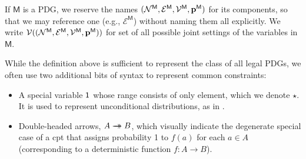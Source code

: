 \documentclass{article}
\newcommand{\commentout}[1]{\ignorespaces}
\newcommand{\doubleheadrightarrow}{%
	\rightarrow\mathrel{\mspace{-15mu}}\rightarrow}
\newcommand{\V}{\mathcal V}
\newcommand{\Ed}{\mathcal E}
\newcommand{\sfM}{\mathsf M}
\newcommand{\MN}{PDG}
\newcommand{\MNs}{\MN s}
\numberwithin{equation}{section}
\begin{document}
	If $\sfM$ is a \MN, we reserve the names $\mnvars[^\sfM]$ for its components, so that we may reference one (e.g., $\Ed^\sfM$) without naming them all explicitly.
	We write $\V(\mnvars[^\sfM])$ for set of all possible joint settings of
        the variables in $\sfM$.  
	

	While the definition above is sufficient to represent the class of all legal \MNs,
	we often use two additional bits of syntax to represent common constraints:  
	\begin{itemize}
	\item A special variable $\sf 1$ 
whose range  consists of only element, which we denote $\star$.
It is used to represent
          unconditional distributions, as in
                  .  
      \commentout{
	          \begin{vfull}
		\begin{examplex}\label{ex:worldsonly}
			A probability distribution $p$ over a measurable set $W$ of possible worlds is represented as 
			\begin{center}
				\scalebox{0.8}{
				\begin{tikzpicture}
					\node[dpadded] (1) at (0,0) {$\sf 1$};
					\node[dpadded] (W) at (3,0) {$W$};
					
					\draw[arr] (1) to node[fill=white]{$p$} (W);
				\end{tikzpicture}}
			\end{center}
		\end{examplex}
		\end{vfull}
      }
		\item Double-headed arrows, $A \doubleheadrightarrow
                  B$, which visually indicate the degenerate special
                  case of a cpt that assigns probability 1 to $f(a)$
                  for each $a \in A$ (corresponding to a deterministic
                  function $f : A \to B$). 
	\end{itemize}
\end{document}
